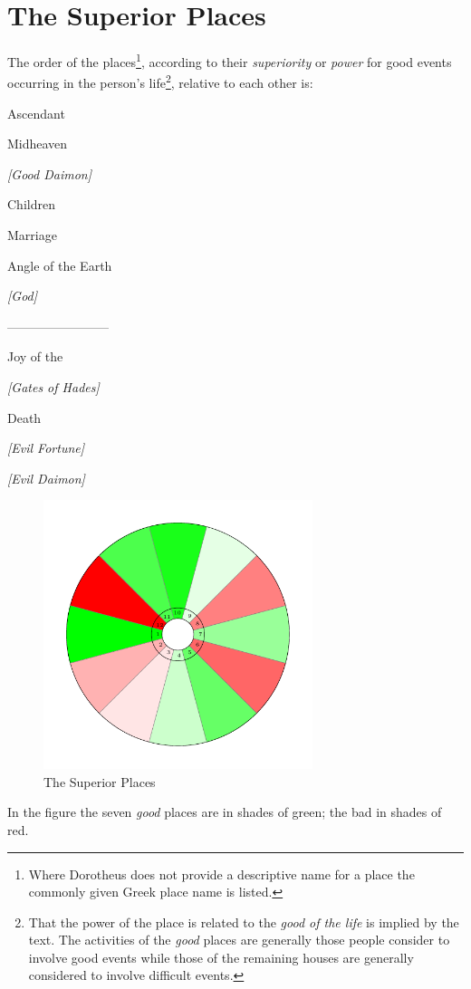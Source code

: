 \section{The Superior Places}

The order of the places\footnote{Where Dorotheus does not provide a descriptive name for a place the commonly given Greek place name is listed.}, according to their \textsl{superiority} or \textsl{power} for good events occurring in the person's life\footnote{That the power of the place is related to the \textsl{good of the life} is implied by the text. The activities of the \textsl{good} places are generally those people consider to involve good events while those of the remaining houses are generally considered to involve difficult events.}, relative to each other is:

\begin{description}[labelindent=0em, labelwidth=4em, labelsep=0.5em, leftmargin =!, align=right, itemsep=0em]
\item[1st] Ascendant
\item[10th] Midheaven
\item[11th] \textsl{[Good Daimon]}
\item[5th] Children
\item[7th] Marriage
\item[4th] Angle of the Earth
\item[9th] \textsl{[God]}
\item[] ------------------------
\item[3rd] Joy of the \Moon
\item[2nd] \textsl{[Gates of Hades]}
\item[8th] Death
\item[6th] \textsl{[Evil Fortune]}
\item[12th] \textsl{[Evil Daimon]}
\end{description}
\vspace{-2em}
\begin{figure}[H]
\centering
\includegraphics[width=0.7\textwidth]{diagrams/superior-places}
\vspace{-1em}
\caption{The Superior Places}
\end{figure}
\begin{mdframed}[backgroundcolor=cyan!5, rightmargin=1em, leftmargin=1em]
\small
In the figure the seven \textsl{good} places are in shades of green; the bad in shades of red.
\end{mdframed}